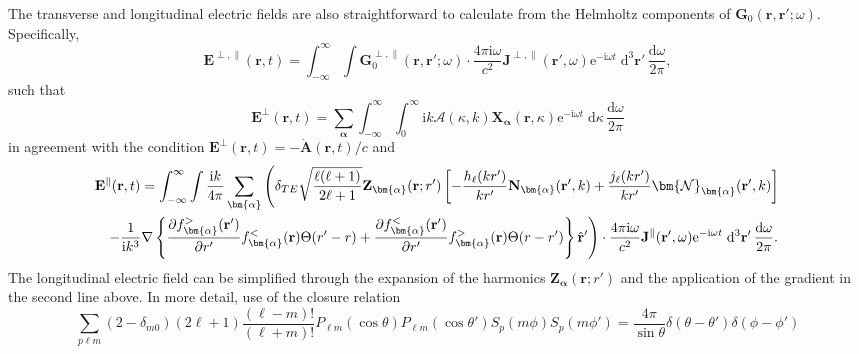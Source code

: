 The transverse and longitudinal electric fields are also straightforward to calculate from the Helmholtz components of $\mathbf{G}_0(\mathbf{r},\mathbf{r}';\omega)$. Specifically, 
\begin{equation}
\mathbf{E}^{\perp,\parallel}(\mathbf{r},t) = \int_{-\infty}^\infty\int\mathbf{G}_0^{\perp,\parallel}(\mathbf{r},\mathbf{r}';\omega)\cdot\frac{4\pi\mathrm{i}\omega}{c^2}\mathbf{J}^{\perp,\parallel}(\mathbf{r}',\omega)\mathrm{e}^{-\mathrm{i}\omega t}\;\mathrm{d}^3\mathbf{r}'\,\frac{\mathrm{d}\omega}{2\pi},
\end{equation}
such that
\begin{equation}
\mathbf{E}^\perp(\mathbf{r},t) = \sum_{\bm{\alpha}}\int_{-\infty}^\infty\int_0^\infty\mathrm{i}k\mathcal{A}(\kappa,k)\mathbf{X}_{\bm{\alpha}}(\mathbf{r},\kappa)\mathrm{e}^{-\mathrm{i}\omega t}\;\mathrm{d}\kappa\,\frac{\mathrm{d}\omega}{2\pi}
\end{equation}
in agreement with the condition $\mathbf{E}^\perp(\mathbf{r},t) = -\dot{\mathbf{A}}(\mathbf{r},t)/c$ and
\begin{equation}\label{eq:Elongitudinal1}
\begin{split}
\mathbf{E}&^\parallel(\mathbf{r},t) = \int_{-\infty}^\infty\int\frac{\mathrm{i}k}{4\pi}\sum_{\bm{\alpha}}\left(\delta_{TE}\sqrt{\frac{\ell(\ell + 1)}{2\ell + 1}}\mathbf{Z}_{\bm{\alpha}}(\mathbf{r};r')\left[-\frac{h_\ell(kr')}{kr'}\mathbf{N}_{\bm{\alpha}}(\mathbf{r}',k) + \frac{j_\ell(kr')}{kr'}\bm{\mathcal{N}}_{\bm{\alpha}}(\mathbf{r}',k)\right]\right.\\
&\left.-\frac{1}{\mathrm{i} k^3}\nabla\left\{\frac{\partial f_{\bm{\alpha}}^>(\mathbf{r}')}{\partial r'}f_{\bm{\alpha}}^<(\mathbf{r})\Theta(r' - r) + \frac{\partial f_{\bm{\alpha}}^<(\mathbf{r}')}{\partial r'}f_{\bm{\alpha}}^>(\mathbf{r})\Theta(r - r')\right\}\hat{\mathbf{r}}' \vphantom{\sqrt{\frac{\ell(\ell + 1)}{2\ell + 1}}} \right) \cdot\frac{4\pi\mathrm{i}\omega}{c^2}\mathbf{J}^\parallel(\mathbf{r}',\omega)\mathrm{e}^{-\mathrm{i}\omega t}\;\mathrm{d}^3\mathbf{r}'\,\frac{\mathrm{d}\omega}{2\pi}.
\end{split}
\end{equation}
The longitudinal electric field can be simplified through the expansion of the harmonics $\mathbf{Z}_{\bm{\alpha}}(\mathbf{r};r')$ and the application of the gradient in the second line above. In more detail, use of the closure relation
\begin{equation}
\sum_{p\ell m}(2 - \delta_{m0})(2\ell + 1)\frac{(\ell - m)!}{(\ell + m)!}P_{\ell m}(\cos\theta)P_{\ell m}(\cos\theta')S_p(m\phi)S_p(m\phi') = \frac{4\pi}{\sin\theta}\delta(\theta - \theta')\delta(\phi - \phi')
\end{equation}
